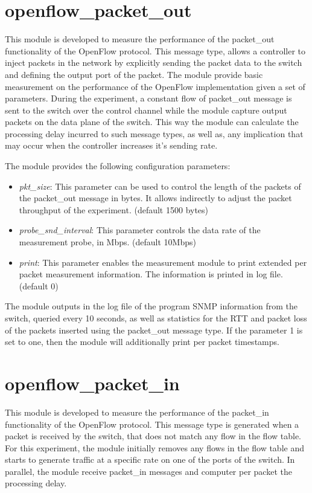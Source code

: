 \documentclass{book}
\begin{document}
\section{openflow\_packet\_out}

This module is developed to measure the performance of the packet\_out
functionality of the OpenFlow protocol. This message type, allows a
controller to inject packets in the network by explicitly sending the packet
data to the switch and defining the output port of the packet. The module
provide basic measurement on the performance of the OpenFlow implementation
given a set of parameters. During the experiment, a constant flow of packet\_out
message is sent to the switch over
the control channel while the module capture output packets on the data plane of the
switch. This way the module can calculate the processing delay incurred to such
message types, as well as, any implication that may occur when the controller
increases it's sending rate. 

The module provides the following configuration parameters:
\begin{itemize}
    \item \emph{pkt\_size}:  This parameter can be used to control the length of the
        packets of the packet\_out message in bytes. It allows indirectly to adjust the packet
        throughput of the experiment. (default 1500 bytes)
    \item \emph{probe\_snd\_interval}: This parameter controls the data rate of the 
        measurement probe, in Mbps. (default 10Mbps)
    \item \emph{print}: This parameter enables the measurement module to print
        extended per packet measurement information. The information is printed in log
        file. (default 0)
\end{itemize}

The module outputs in the log file of the program SNMP information from the switch, queried
every 10 seconds, as well as statistics for the RTT and packet loss of the
packets inserted using the packet\_out message type. If the parameter 1 is set
to one, then the module will additionally print per packet timestamps. 

\section{openflow\_packet\_in}

This module is developed to measure the performance of the packet\_in
functionality of the OpenFlow protocol. This message type is generated when a
packet is received by the switch, that does not match any flow in the flow
table. For this experiment, the module initially removes any flows in the flow table and starts
to generate traffic at a specific rate on one of the ports of the switch. 
In parallel, the module receive packet\_in messages and computer per packet the
processing delay.
\end{document}
